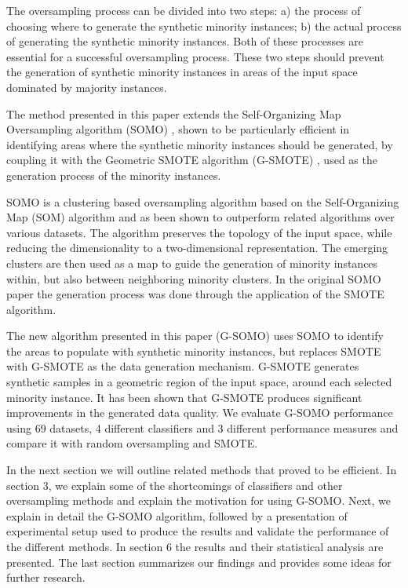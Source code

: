 \documentclass[parskip=full]{scrartcl}
\begin{document}
The oversampling process can be divided into two steps: a) the process of
choosing where to generate the synthetic minority instances; b) the actual
process of generating the synthetic minority instances. Both of these processes
are essential for a successful oversampling process. These two steps should
prevent the generation of synthetic minority instances in areas of the input
space dominated by majority instances.

The method presented in this paper extends the Self-Organizing Map Oversampling
algorithm (SOMO) \cite{Douzas2017B}, shown to be particularly efficient in
identifying areas where the synthetic minority instances should be generated, by
coupling it with the Geometric SMOTE algorithm (G-SMOTE) \cite{Douzas2017}, used
as the generation process of the minority instances.

SOMO is a clustering based oversampling algorithm based on the Self-Organizing
Map (SOM) algorithm and as been shown to outperform related algorithms over
various datasets. The algorithm preserves the topology of the input space, while
reducing the dimensionality to a two-dimensional representation. The emerging
clusters are then used as a map to guide the generation of minority instances
within, but also between neighboring minority clusters. In the original SOMO
paper the generation process was done through the application of the SMOTE
algorithm.

The new algorithm presented in this paper (G-SOMO) uses SOMO to identify the
areas to populate with synthetic minority instances, but replaces SMOTE with
G-SMOTE as the data generation mechanism. G-SMOTE generates synthetic samples in
a geometric region of the input space, around each selected minority instance.
It has been shown that G-SMOTE produces significant improvements in the
generated data quality. We evaluate G-SOMO performance using 69 datasets, 4
different classifiers and 3 different performance measures and compare it with
random oversampling and SMOTE.

In the next section we will outline related methods that proved to be efficient.
In section 3, we explain some of the shortcomings of classifiers and other
oversampling methods and explain the motivation for using G-SOMO. Next, we
explain in detail the G-SOMO algorithm, followed by a presentation of
experimental setup used to produce the results and validate the performance of
the different methods. In section 6 the results and their statistical analysis
are presented. The last section summarizes our findings and provides some ideas
for further research.
\end{document}

